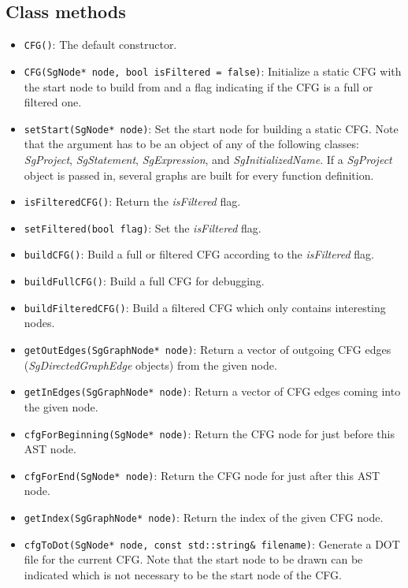 \subsection{Class methods}

\begin{itemize}
\item \lstinline{CFG()}: The default constructor. 
\item \lstinline{CFG(SgNode* node, bool isFiltered = false)}: Initialize a static CFG with the start 
node to build from and a flag indicating if the CFG is a full or filtered one.                                              
\item \lstinline{setStart(SgNode* node)}: Set the start node for building a static CFG. Note that the argument
has to be an object of any of the following classes: \textit{SgProject}, \textit{SgStatement}, \textit{SgExpression},
and \textit{SgInitializedName}. If a \textit{SgProject} object is passed in, several graphs are built for every
function definition. 
\item \lstinline{isFilteredCFG()}: Return the \textit{isFiltered} flag.
\item \lstinline{setFiltered(bool flag)}: Set the \textit{isFiltered} flag.                 
\item \lstinline{buildCFG()}: Build a full or filtered CFG according to the \textit{isFiltered} flag.
\item \lstinline{buildFullCFG()}: Build a full CFG for debugging.
\item \lstinline{buildFilteredCFG()}: Build a filtered CFG which only contains interesting nodes.
\item \lstinline{getOutEdges(SgGraphNode* node)}: Return a vector of outgoing CFG edges (\textit{SgDirectedGraphEdge} objects) from the given node.
\item \lstinline{getInEdges(SgGraphNode* node)}: Return a vector of CFG edges coming into the given node.
\item \lstinline{cfgForBeginning(SgNode* node)}: Return the CFG node for just before this AST node.                               
\item \lstinline{cfgForEnd(SgNode* node)}: Return the CFG node for just after this AST node.                               
\item \lstinline{getIndex(SgGraphNode* node)}: Return the index of the given CFG node.
\item \lstinline{cfgToDot(SgNode* node, const std::string& filename)}: Generate a DOT file for the current CFG. Note that the start node
to be drawn can be indicated which is not necessary to be the start node of the CFG.                                                      
\end{itemize}

